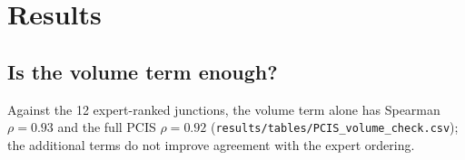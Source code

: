 \section{Results}


\subsection{Is the volume term enough?}
Against the 12 expert-ranked junctions, the volume term alone has Spearman $\rho=0.93$ and the full PCIS $\rho=0.92$ (\texttt{results/tables/PCIS\_volume\_check.csv}); the additional terms do not improve agreement with the expert ordering.
